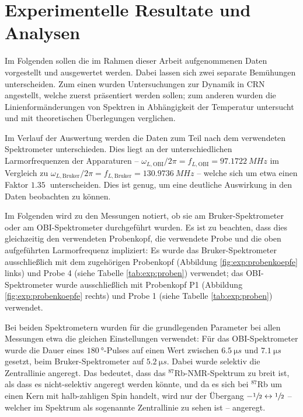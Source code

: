 \chapter{Experimentelle Resultate und Analysen}
\label{chapter:experiment}

Im Folgenden sollen die im Rahmen dieser Arbeit aufgenommenen Daten vorgestellt und ausgewertet werden. Dabei lassen sich zwei separate Bemühungen unterscheiden. Zum einen wurden Untersuchungen zur Dynamik in CRN angestellt, welche zuerst präsentiert werden sollen; zum anderen wurden die Linienformänderungen von Spektren in Abhängigkeit der Temperatur untersucht und mit theoretischen Überlegungen verglichen.

Im Verlauf der Auswertung werden die Daten zum Teil nach dem verwendeten Spektrometer unterschieden. Dies liegt an der unterschiedlichen Larmorfrequenzen der Apparaturen -- $\omega_{L, \text{OBI}} / 2\pi = f_{L, \text{OBI}} = \SI{97.1722}{MHz}$ im Vergleich zu $\omega_{L, \text{Bruker}} / 2\pi = f_{L, \text{Bruker}} = \SI{130.9736}{MHz}$ -- welche sich um etwa einen Faktor $\SI{1.35}{}$ unterscheiden. Dies ist genug, um eine deutliche Auswirkung in den Daten beobachten zu können.

Im Folgenden wird zu den Messungen notiert, ob sie am Bruker-Spektrometer oder am OBI-Spektrometer durchgeführt wurden. Es ist zu beachten, dass dies gleichzeitig den verwendeten Probenkopf, die verwendete Probe und die oben aufgeführten Larmorfrequenz impliziert: Es wurde das Bruker-Spektrometer ausschließlich mit dem zugehörigen Probenkopf (Abbildung \ref{fig:exp:probenkoepfe} links) und Probe 4 (siehe Tabelle \ref{tab:exp:proben}) verwendet; das OBI-Spektrometer wurde ausschließlich mit Probenkopf P1 (Abbildung \ref{fig:exp:probenkoepfe} rechts) und Probe 1 (siehe Tabelle \ref{tab:exp:proben}) verwendet.

Bei beiden Spektrometern wurden für die grundlegenden Parameter bei allen Messungen etwa die gleichen Einstellungen verwendet: Für das OBI-Spektrometer wurde die Dauer eines $\SI{180}{\degree}$-Pulses auf einen Wert zwischen $\SI{6.5}{\micro s}$ und $\SI{7.1}{\micro s}$ gesetzt, beim Bruker-Spektrometer auf $\SI{5.2}{\micro s}$. Dabei wurde selektiv die Zentrallinie angeregt. Das bedeutet, dass das $^\text{87}$Rb-NMR-Spektrum zu breit ist, als dass es nicht-selektiv angeregt werden könnte, und da es sich bei $^\text{87}$Rb um einen Kern mit halb-zahligen Spin handelt, wird nur der Übergang $-\sfrac{1}{2} \leftrightarrow \sfrac{1}{2}$ -- welcher im Spektrum als sogenannte Zentrallinie zu sehen ist -- angeregt.


